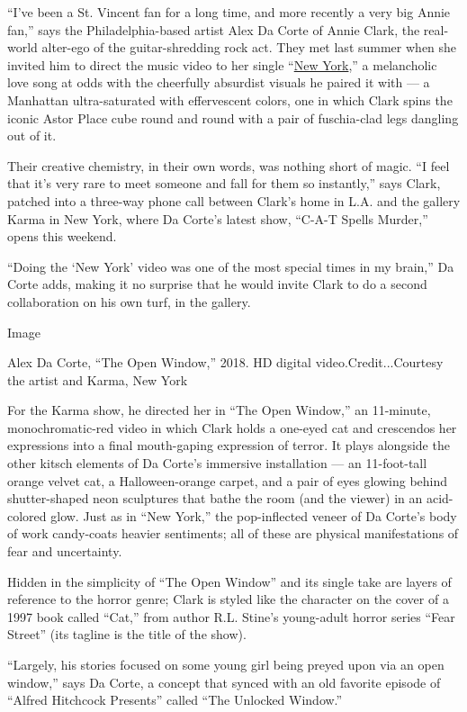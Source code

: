 ``I've been a St. Vincent fan for a long time, and more recently a very
big Annie fan,'' says the Philadelphia-based artist Alex Da Corte of
Annie Clark, the real-world alter-ego of the guitar-shredding rock act.
They met last summer when she invited him to direct the music video to
her single ``\href{https://www.youtube.com/watch?v=4TPqUvy1vYU}{New
York},'' a melancholic love song at odds with the cheerfully absurdist
visuals he paired it with --- a Manhattan ultra-saturated with
effervescent colors, one in which Clark spins the iconic Astor Place
cube round and round with a pair of fuschia-clad legs dangling out of
it.

Their creative chemistry, in their own words, was nothing short of
magic. ``I feel that it's very rare to meet someone and fall for them so
instantly,'' says Clark, patched into a three-way phone call between
Clark's home in L.A. and the gallery Karma in New York, where Da Corte's
latest show, ``C-A-T Spells Murder,'' opens this weekend.

``Doing the `New York' video was one of the most special times in my
brain,'' Da Corte adds, making it no surprise that he would invite Clark
to do a second collaboration on his own turf, in the gallery.

Image

Alex Da Corte, ``The Open Window,'' 2018. HD digital
video.Credit...Courtesy the artist and Karma, New York

For the Karma show, he directed her in ``The Open Window,'' an
11-minute, monochromatic-red video in which Clark holds a one-eyed cat
and crescendos her expressions into a final mouth-gaping expression of
terror. It plays alongside the other kitsch elements of Da Corte's
immersive installation --- an 11-foot-tall orange velvet cat, a
Halloween-orange carpet, and a pair of eyes glowing behind
shutter-shaped neon sculptures that bathe the room (and the viewer) in
an acid-colored glow. Just as in ``New York,'' the pop-inflected veneer
of Da Corte's body of work candy-coats heavier sentiments; all of these
are physical manifestations of fear and uncertainty.

Hidden in the simplicity of ``The Open Window'' and its single take are
layers of reference to the horror genre; Clark is styled like the
character on the cover of a 1997 book called ``Cat,'' from author R.L.
Stine's young-adult horror series ``Fear Street'' (its tagline is the
title of the show).

``Largely, his stories focused on some young girl being preyed upon via
an open window,'' says Da Corte, a concept that synced with an old
favorite episode of ``Alfred Hitchcock Presents'' called ``The Unlocked
Window.''

